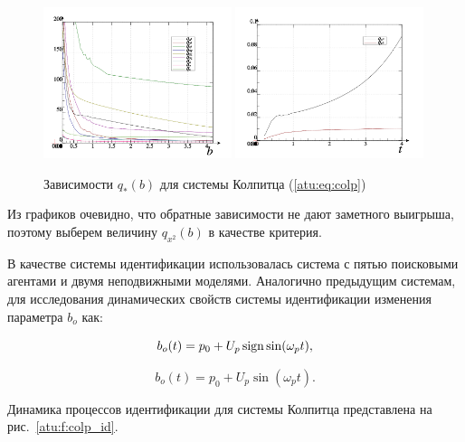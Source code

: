 \begin{figure}[htb!]
\centerline{
  \includegraphics[width=0.49\textwidth]{p/cha/colp/colp_p-p_b_e.png}
  \includegraphics[width=0.49\textwidth]{p/cha/colp/colp_p-p_b_1ex2.png}
}
  \caption{Зависимости $q_{*}(b) $ для системы Колпитца (\ref{atu:eq:colp})}
\label{atu:f:colp_q}
\end{figure}

Из графиков очевидно, что
обратные зависимости не дают заметного выигрыша, поэтому выберем
величину $ q_{x^2}(b) $ в качестве критерия.

В качестве системы идентификации использовалась система с пятью поисковыми агентами и
двумя неподвижными моделями. Аналогично предыдущим системам,
для исследования динамических свойств системы идентификации
изменения параметра $b_o$ как:

\begin{equation}
 b_o(t) = p_0 + U_p \operatorname*{sign} \sin( \omega_p t ),
  \label{atu:eq:colp_b_sign}
\end{equation}

\begin{equation}
 b_o(t) = p_0 + U_p \sin( \omega_p t ).
  \label{atu:eq:colp_b_sin}
\end{equation}

Динамика процессов идентификации для системы Колпитца представлена на рис.~\ref{atu:f:colp_id}.

